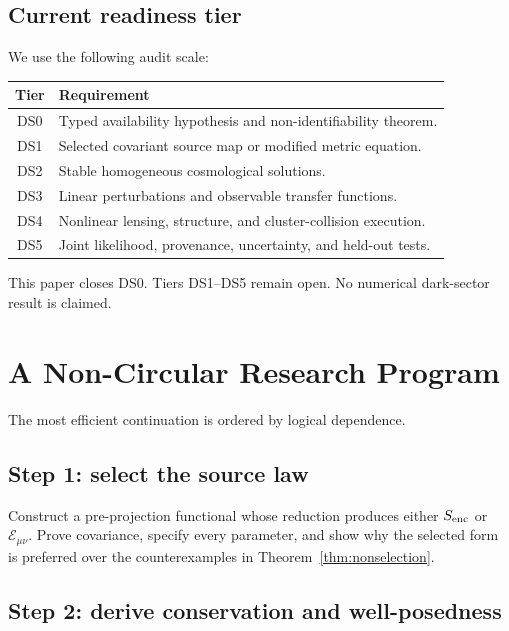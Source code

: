 \documentclass[11pt]{article}
\begin{document}
\subsection{Current readiness tier}

We use the following audit scale:
\begin{center}
\begin{tabular}{|c|p{9.5cm}|}
\hline
Tier & Requirement \\ \hline
DS0 & Typed availability hypothesis and non-identifiability theorem. \\ \hline
DS1 & Selected covariant source map or modified metric equation. \\ \hline
DS2 & Stable homogeneous cosmological solutions. \\ \hline
DS3 & Linear perturbations and observable transfer functions. \\ \hline
DS4 & Nonlinear lensing, structure, and cluster-collision execution. \\ \hline
DS5 & Joint likelihood, provenance, uncertainty, and held-out tests. \\ \hline
\end{tabular}
\end{center}

\begin{remark}
This paper closes DS0.  Tiers DS1--DS5 remain open.  No numerical dark-sector
result is claimed.
\end{remark}

\section{A Non-Circular Research Program}

The most efficient continuation is ordered by logical dependence.

\subsection{Step 1: select the source law}

Construct a pre-projection functional whose reduction produces either
$S_{\rm enc}$ or $\mathcal E_{\mu\nu}$.  Prove covariance, specify every
parameter, and show why the selected form is preferred over the
counterexamples in Theorem~\ref{thm:nonselection}.

\subsection{Step 2: derive conservation and well-posedness}
\end{document}
